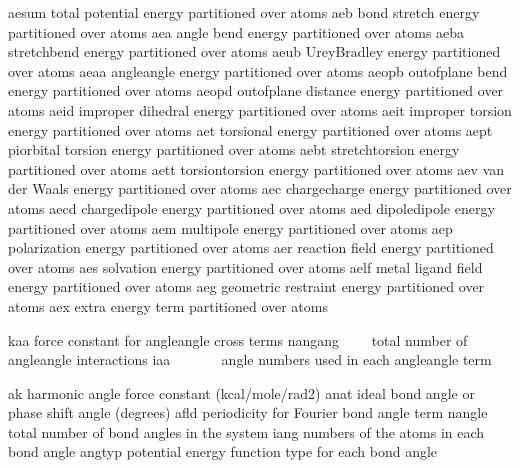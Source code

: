 \documentclass[letterpaper,11pt,english]{sphinxmanual}
\begin{document}
\begin{sphinxVerbatim}[commandchars=\\\{\}]
aesum           total potential energy partitioned over atoms
aeb             bond stretch energy partitioned over atoms
aea             angle bend energy partitioned over atoms
aeba            stretch\PYGZhy{}bend energy partitioned over atoms
aeub            Urey\PYGZhy{}Bradley energy partitioned over atoms
aeaa            angle\PYGZhy{}angle energy partitioned over atoms
aeopb           out\PYGZhy{}of\PYGZhy{}plane bend energy partitioned over atoms
aeopd           out\PYGZhy{}of\PYGZhy{}plane distance energy partitioned over atoms
aeid            improper dihedral energy partitioned over atoms
aeit            improper torsion energy partitioned over atoms
aet             torsional energy partitioned over atoms
aept            pi\PYGZhy{}orbital torsion energy partitioned over atoms
aebt            stretch\PYGZhy{}torsion energy partitioned over atoms
aett            torsion\PYGZhy{}torsion energy partitioned over atoms
aev             van der Waals energy partitioned over atoms
aec             charge\PYGZhy{}charge energy partitioned over atoms
aecd            charge\PYGZhy{}dipole energy partitioned over atoms
aed             dipole\PYGZhy{}dipole energy partitioned over atoms
aem             multipole energy partitioned over atoms
aep             polarization energy partitioned over atoms
aer             reaction field energy partitioned over atoms
aes             solvation energy partitioned over atoms
aelf            metal ligand field energy partitioned over atoms
aeg             geometric restraint energy partitioned over atoms
aex             extra energy term partitioned over atoms
\end{sphinxVerbatim}


\begin{sphinxVerbatim}[commandchars=\\\{\}]
kaa             force constant for angle\PYGZhy{}angle cross terms
nangang         total number of angle\PYGZhy{}angle interactions
iaa             angle numbers used in each angle\PYGZhy{}angle term
\end{sphinxVerbatim}


\begin{sphinxVerbatim}[commandchars=\\\{\}]
ak              harmonic angle force constant (kcal/mole/rad\PYGZca{}2)
anat            ideal bond angle or phase shift angle (degrees)
afld            periodicity for Fourier bond angle term
nangle          total number of bond angles in the system
iang            numbers of the atoms in each bond angle
angtyp          potential energy function type for each bond angle
\end{sphinxVerbatim}
\end{document}
